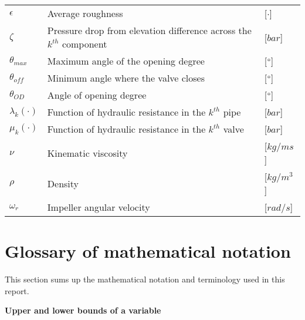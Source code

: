 \begin{tabular}{l l l}
	$\epsilon$		&	Average roughness									     	& [$\cdot$]\\
	$\zeta$			&	Pressure drop from elevation difference across the $k^{th}$ component	& [$bar$]\\
	$\theta_{max}$	&	Maximum angle of the opening degree						    & [$\degree$]\\
	$\theta_{off}$	&	Minimum angle where the valve closes						& [$\degree$]\\
	$\theta_{OD}$	&	Angle of opening degree										& [$\degree$]\\
	$\lambda_k(\cdot)$	&	Function of hydraulic resistance in the $k^{th}$ pipe		& [$bar$]\\
	$\mu_k(\cdot)$		&	Function of hydraulic resistance in the $k^{th}$ valve		& [$bar$]\\
	$\nu$			&	Kinematic viscosity									     	& [$kg/ms$]\\
	$\rho$			&	Density									     				& [$kg/m^3$]\\
	$\omega_r$		&	Impeller angular velocity									& [$rad/s$]\\
	
\end{tabular}


\newpage
\section*{Glossary of mathematical notation}

This section sums up the mathematical notation and terminology used in this report.

\textbf{Upper and lower bounds of a variable}

